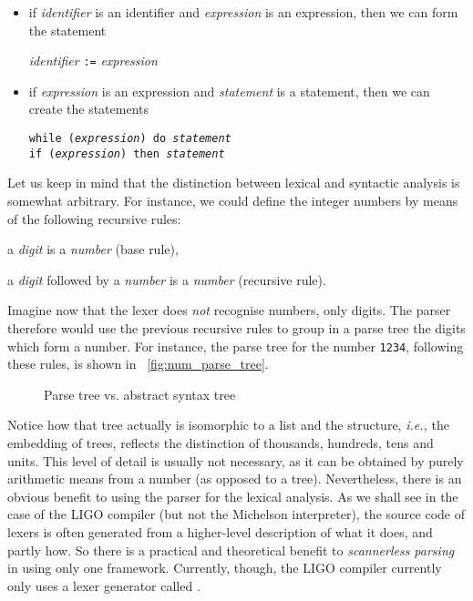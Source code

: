 \documentclass[12pt,a4paper]{article}
\begin{document}
\begin{itemize}

  \item if \emph{identifier} is an identifier and
    \emph{expression} is an expression, then we can form the statement
    \begin{center}
      \emph{identifier} \texttt{:=} \emph{expression}
    \end{center}

  \item if \emph{expression} is an expression and \emph{statement} is
    a statement, then we can create the statements
    \begin{center}
     \tt while (\emph{expression}) do \emph{statement}\\
     if (\emph{expression}) then \emph{statement}
    \end{center}

\end{itemize}
Let us keep in mind that the distinction between lexical and syntactic
analysis is somewhat arbitrary. For instance, we could define the
integer numbers by means of the following recursive rules:
\begin{itemize*}

  \item a \emph{digit} is a \emph{number} (base rule),

  \item a \emph{digit} followed by a \emph{number} is a \emph{number}
    (recursive rule).

\end{itemize*}
Imagine now that the lexer does \emph{not} recognise numbers, only
digits. The parser therefore would use the previous recursive rules to
group in a parse tree the digits which form a number. For instance,
the parse tree for the number \texttt{1234}, following these rules, is
shown in \fig~\vref{fig:num_parse_tree}.
\begin{figure}
\centering
{}
\quad
{}
\caption{Parse tree vs. abstract syntax tree}
\end{figure}
Notice how that tree actually is isomorphic to a list and the
structure, \emph{i.e.,} the embedding of trees, reflects the
distinction of thousands, hundreds, tens and units. This level of
detail is usually not necessary, as it can be obtained by purely
arithmetic means from a number (as opposed to a tree). Nevertheless,
there is an obvious benefit to using the parser for the lexical
analysis. As we shall see in the case of the LIGO compiler (but not
the Michelson interpreter), the source code of lexers is often
generated from a higher\hyp{}level description of what it does, and
partly how. So there is a practical and theoretical benefit to
\emph{scannerless parsing} in using only one framework. Currently,
though, the LIGO compiler currently only uses a lexer generator called
\ocamllex.
\end{document}

